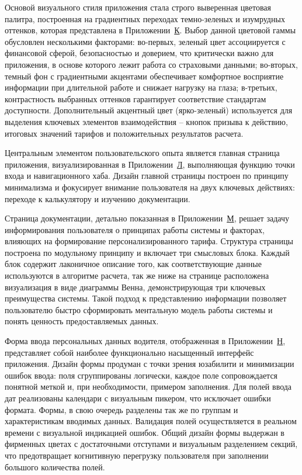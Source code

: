 Основой визуального стиля приложения стала строго выверенная цветовая палитра, построенная на градиентных переходах темно-зеленых и изумрудных оттенков, которая представлена в Приложении~\hyperref[app:colors]{К}. Выбор данной цветовой гаммы обусловлен несколькими факторами: во-первых, зеленый цвет ассоциируется с финансовой сферой, безопасностью и доверием, что критически важно для приложения, в основе которого лежит работа со страховыми данными; во-вторых, темный фон с градиентными акцентами обеспечивает комфортное восприятие информации при длительной работе и снижает нагрузку на глаза; в-третьих, контрастность выбранных оттенков гарантирует соответствие стандартам доступности. Дополнительный акцентный цвет (ярко-зеленый) используется для выделения ключевых элементов взаимодействия – кнопок призыва к действию, итоговых значений тарифов и положительных результатов расчета.

Центральным элементом пользовательского опыта является главная страница приложения, визуализированная в Приложении~\hyperref[app:main_page]{Л}, выполняющая функцию точки входа и навигационного хаба. Дизайн главной страницы построен по принципу минимализма и фокусирует внимание пользователя на двух ключевых действиях: переходе к калькулятору и изучению документации.

Страница документации, детально показанная в Приложении~\hyperref[app:docs_page]{М}, решает задачу информирования пользователя о принципах работы системы и факторах, влияющих на формирование персонализированного тарифа. Структура страницы построена по модульному принципу и включает три смысловых блока. Каждый блок содержит лаконичное описание того, как соответствующие данные используются в алгоритме расчета, так же ниже на странице расположена визуализация в виде диаграммы Венна, демонстрирующая три ключевых преимущества системы. Такой подход к представлению информации позволяет пользователю быстро сформировать ментальную модель работы системы и понять ценность предоставляемых данных.

Форма ввода персональных данных водителя, отображенная в Приложении~\hyperref[app:form_page]{Н}, представляет собой наиболее функционально насыщенный интерфейс приложения. Дизайн формы продуман с точки зрения юзабилити и минимизации ошибок ввода: поля сгруппированы логически, каждое поле сопровождается понятной меткой и, при необходимости, примером заполнения. Для полей ввода дат реализованы календари с визуальным пикером, что исключает ошибки формата. Формы, в свою очередь разделены так же по группам и характеристикам вводимых данных. Валидация полей осуществляется в реальном времени с визуальной индикацией ошибок. Общий дизайн формы выдержан в фирменных цветах с достаточными отступами и визуальным разделением секций, что предотвращает когнитивную перегрузку пользователя при заполнении большого количества полей.

